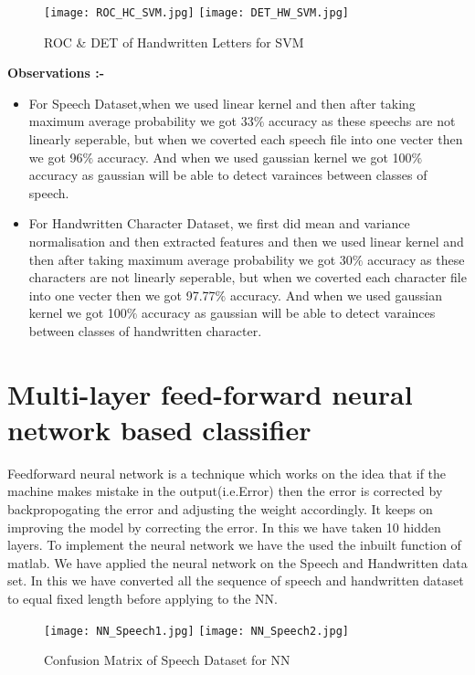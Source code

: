 \documentclass[12pt]{report}
\begin{document}
\begin{figure}[H]
	\centering
	\texttt{[image: ROC\_HC\_SVM.jpg]}
	\texttt{[image: DET\_HW\_SVM.jpg]}
	\caption{ROC \& DET  of Handwritten Letters for SVM}
\end{figure}


\noindent
{\bfseries Observations :-}\\
\begin{itemize}
	\item For Speech Dataset,when we used linear kernel and then after taking maximum average probability we got 33$ \% $ accuracy as these speechs are not linearly seperable, but when we coverted each speech file into one vecter then we got 96$ \% $ accuracy. And when we used gaussian kernel we got 100$ \% $ accuracy as gaussian will be able to detect varainces between classes of speech.\\

\item For Handwritten Character Dataset, we first did mean and variance normalisation and then extracted features and then we used linear kernel and then after taking maximum average probability we got 30$ \% $ accuracy as these characters are not linearly seperable, but when we coverted each character file into one vecter then we got 97.77$ \% $ accuracy. And when we used gaussian kernel we got 100$ \% $ accuracy as gaussian will be able to detect varainces between classes of handwritten character.
\end{itemize}



\section{Multi-layer feed-forward neural network based classifier}
Feedforward neural network is a technique which works on the idea that if the machine makes mistake in the output(i.e.Error) then the error is corrected by backpropogating the error and adjusting the weight accordingly. It keeps on improving the model by correcting the error. In this we have taken 10 hidden layers. To implement the neural network we have the used the inbuilt function of matlab. We have applied the neural network on the Speech and Handwritten data set. In this we have converted all the sequence of speech and handwritten dataset to equal fixed length before applying to the NN.\\


\begin{figure}[H]
	\centering
	\texttt{[image: NN\_Speech1.jpg]}
	\texttt{[image: NN\_Speech2.jpg]}
	\caption{Confusion Matrix of Speech Dataset for NN}
\end{figure}
\end{document}
